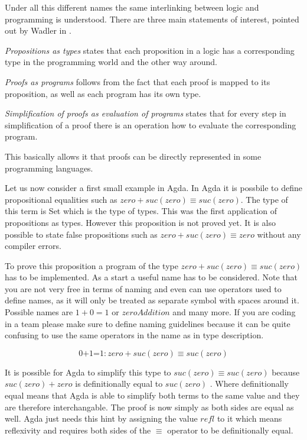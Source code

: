 Under all this different names the same interlinking between logic and programming is understood. There are three main statements of interest, pointed out by Wadler in \cite{10.1145/2699407}.

\emph{Propositions as types} states that each proposition in a logic has a corresponding type in the programming world and the other way around. 

\emph{Proofs as programs} follows from the fact that each proof is mapped to its proposition, as well as each program has its own type.

\emph{Simplification of proofs as evaluation of programs} states that for every step in simplification of a proof there is an operation how to evaluate the corresponding program.

This basically allows it that proofs can be directly represented in some programming languages.

Let us now consider a first small example in Agda.
In Agda it is possbile to define propositional equalities such as $zero + suc(zero) \equiv suc(zero)$. The type of this term is Set which is the type of types. This was the first application of propositions as types.
However this proposition is not proved yet. It is also possible to state false propositions such as $zero + suc(zero) \equiv zero$ without any compiler errors.

To prove this proposition a program of the type $zero + suc(zero) \equiv suc(zero)$ has to be implemented.
As a start a useful name has to be considered. Note that you are not very free in terms of naming and even can use operators used to define names, as it will only be treated as separate symbol with spaces around it. Possible names are $1+0=1$ or $zeroAddition$ and many more. 
If you are coding in a team please make sure to define naming guidelines because it can be quite confusing to use the same operators in the name as in type description.

$$\text{0+1=1} : zero + suc(zero) \equiv suc(zero)$$

It is possible for Agda to simplify this type to $suc(zero) \equiv suc(zero)$ because $suc(zero) + zero$ is definitionally equal to $suc(zero)$ . Where definitionally equal means that Agda is able to simplify both terms to the same value and they are therefore interchangable.
The proof is now simply as both sides are equal as well. Agda just needs this hint by assigning the value $refl$ to it which means reflexivity and requires both sides of the $\equiv$ operator to be definitionally equal.

